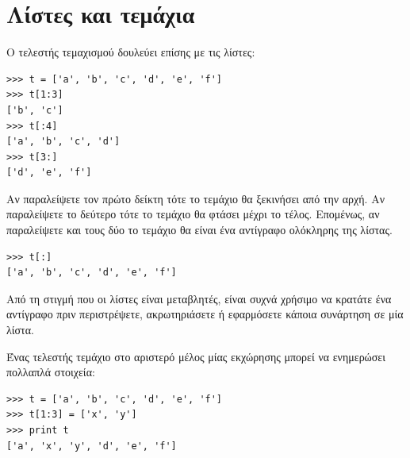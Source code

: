 \documentclass[10pt]{book}
\begin{document}
\section{Λίστες και τεμάχια}

Ο τελεστής τεμαχισμού δουλεύει επίσης με τις λίστες:

\begin{verbatim}
>>> t = ['a', 'b', 'c', 'd', 'e', 'f']
>>> t[1:3]
['b', 'c']
>>> t[:4]
['a', 'b', 'c', 'd']
>>> t[3:]
['d', 'e', 'f']
\end{verbatim}
%

Αν παραλείψετε τον πρώτο δείκτη τότε το τεμάχιο θα ξεκινήσει από την αρχή.
Αν παραλείψετε το δεύτερο τότε το τεμάχιο θα φτάσει μέχρι το τέλος. Επομένως, αν παραλείψετε και τους δύο το τεμάχιο θα είναι ένα αντίγραφο ολόκληρης της λίστας.

\begin{verbatim}
>>> t[:]
['a', 'b', 'c', 'd', 'e', 'f']
\end{verbatim}
%

Από τη στιγμή που οι λίστες είναι μεταβλητές, είναι συχνά χρήσιμο να κρατάτε ένα αντίγραφο πριν περιστρέψετε, ακρωτηριάσετε ή εφαρμόσετε κάποια συνάρτηση σε μία λίστα.

Ένας τελεστής τεμάχιο στο αριστερό μέλος μίας εκχώρησης μπορεί να ενημερώσει πολλαπλά στοιχεία:

\begin{verbatim}
>>> t = ['a', 'b', 'c', 'd', 'e', 'f']
>>> t[1:3] = ['x', 'y']
>>> print t
['a', 'x', 'y', 'd', 'e', 'f']
\end{verbatim}
%


%

%
\end{document}
